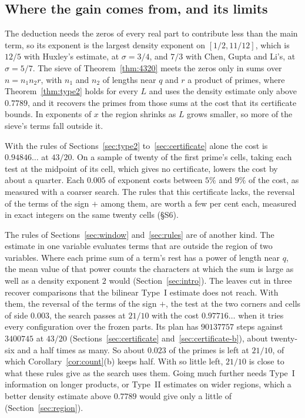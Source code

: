 \documentclass[11pt]{article}
\theoremstyle{definition}
\begin{document}
\subsection*{Where the gain comes from, and its limits}

The deduction needs the zeros of every real part to contribute less than the main term, so its exponent is the
largest density exponent on $[1/2, 11/12]$, which is $12/5$ with Huxley's estimate, at $\sigma = 3/4$, and $7/3$ with
Chen, Gupta and Li's, at $\sigma = 5/7$. The sieve of Theorem~\ref{thm:4320} meets the zeros only in sums over
$n = n_1 n_2 r$, with $n_1$ and $n_2$ of lengths near $q$ and $r$ a product of primes, where Theorem~\ref{thm:type2}
holds for every $L$ and uses the
density estimate only above $0.7789$, and it recovers the primes from those sums at the cost that its certificate
bounds. In exponents of $x$ the region shrinks as $L$ grows smaller, so more of the sieve's terms fall outside it.

With the rules of Sections~\ref{sec:type2} to~\ref{sec:certificate} alone the cost is $0.94846\ldots$ at $43/20$. On
a sample of twenty of the first prime's cells, taking each test at the midpoint of its cell, which gives no
certificate, lowers the cost by about a quarter. Each $0.005$ of exponent costs between $5\%$ and $9\%$ of the cost,
as measured with a coarser search. The rules that this certificate lacks, the reversal of the terms of the sign $+$
among them, are worth a few per cent each, measured in exact integers on the same twenty cells (\S S6).

The rules of Sections~\ref{sec:window} and~\ref{sec:rules} are of another kind. The estimate in one variable evaluates
terms that are outside the region of two variables. Where each prime sum of a term's rest has a power of length near
$q$, the mean value of that power counts the characters at which the sum is large as well as a density exponent $2$
would (Section~\ref{sec:intro}). The leaves cut in three recover comparisons that the
bilinear
Type~I estimate does
not reach. With them, the reversal of the terms of the sign $+$, the test at the two corners and cells of side $0.003$,
the search passes at $21/10$ with the cost $0.97716\ldots$ when it tries every configuration over the frozen parts.
Its plan has $90137757$ steps against $3400745$ at $43/20$ (Sections~\ref{sec:certificate}
and~\ref{sec:certificate-b}), about twenty-six and a half times as many. So about
$0.023$ of the primes is left at
$21/10$, of which Corollary~\ref{cor:count}(b) keeps half. With so little left, $21/10$ is close to what these rules
give as the search uses them. Going much further needs
Type~I information on longer products, or Type~II estimates on wider regions, which a better density estimate above
$0.7789$ would give only a little of (Section~\ref{sec:region}).
\end{document}

